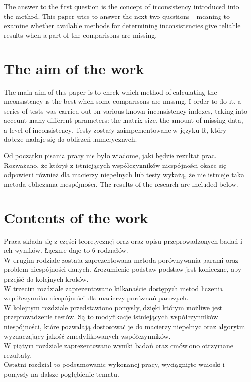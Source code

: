 The answer to the first question is the concept of inconsistency introduced into the method. This paper tries to answer the next two questions - meaning to examine whether available methods for determining inconsistencies give reliable results when a part of the comparisons are missing. 

\section{The aim of the work}
\label{sec:celePracy}
The main aim of this paper is to check which method of calculating the inconsistency is the best when some comparisons are missing. I order to do it, a series of tests was carried out on various known inconsistency indexes, taking into account many different parameters: the matrix size, the amount of missing data, a level of inconsistency.
Testy zostały zaimpementowane w języku R, który dobrze nadaje się do obliczeń numerycznych.

Od początku pisania pracy nie było wiadome, jaki będzie rezultat prac. Rozważano, że któryś z istniejących współczynników niespójności okaże się odpowieni również dla macierzy niepełnych lub testy wykażą, że nie istnieje taka metoda obliczania niespójności.
The results of the research are included below.

\section{Contents of the work}
\label{sec:zawartoscPracy}
Praca składa się z części teoretycznej oraz oraz opisu przeprowadzonych badań i ich wyników. Łącznie daje to 6 rodziałów.\\
W drugim rodziale została zaprezentowana metoda porównywania parami oraz problem niespójności danych. Zrozumienie podstaw podstaw jest konieczne, aby przejść do kolejnych kroków.\\
W trzecim rozdziale zaprezentowano kilkanaście dostępych metod liczenia współczynnika niespójności dla macierzy porównań parowych.\\
W kolejnym rozdziale przedstawiono pomysły, dzięki którym możliwe jest przeprowadzenie testów. Są to modyfikacje istniejących współczynników niespójności, które pozwalają dostosować je do macierzy niepełnyc oraz algorytm wyznaczający jakość zmodyfikowanych współczynników. \\
W piątym rozdziale zaprezentowano wyniki badań oraz omówiono otrzymane rezultaty.\\
Ostatni rozdział to podsumowanie wykonanej pracy, wyciągnięte wnioski i pomysły na dalsze pogłębienie tematu.
